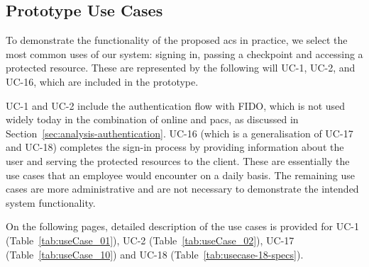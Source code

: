 \subsection{Prototype Use Cases} \label{sec:design-prototype-usecases}
To demonstrate the functionality of the proposed \acrshort{acs} in practice, we select the most common uses of our system: signing in, passing a checkpoint and accessing a protected resource. These are represented by the  following will UC-1, UC-2, and UC-16, which are included in the prototype. 

UC-1 and UC-2 include the authentication flow with FIDO, which is not used widely today in the combination of online and \acrshort{pacs}, as discussed in Section~\ref{sec:analysis-authentication}. UC-16 (which is a generalisation of UC-17 and UC-18) completes the sign-in process by providing information about the user and serving the protected resources to the client. These are essentially the use cases that an employee would encounter on a daily basis. The remaining use cases are more administrative and are not necessary to demonstrate the intended system functionality.


On the following pages, detailed description of the use cases is provided for UC-1 (Table~\ref{tab:useCase_01}), UC-2 (Table~\ref{tab:useCase_02}), UC-17 (Table~\ref{tab:useCase_10}) and UC-18 (Table~\ref{tab:usecase-18-specs}).




